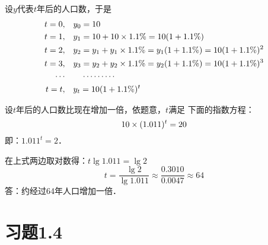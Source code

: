 \begin{solution}
设$y$代表$t$年后的人口数，于是
\[\begin{split}
    t=0,&\quad y_0=10\\
t=1,&\quad y_1=10+10\times1.1\%=10(1+1.1\%)\\
t=2,&\quad y_2=y_1+y_1\times1.1\%=y_1(1+1.1\%)=10(1+1.1\%)^2\\
t=3,&\quad y_3=y_2+y_2\times1.1\%=y_2(1+1.1\%)=10(1+1.1\%)^3\\
\cdots & \qquad \cdots\cdots\cdots\\
t=t,&\quad y_t=10(1+1.1\%)^t
\end{split}\]

设$t$年后的人口数比现在增加一倍，依题意，$t$满足
下面的指数方程：
\[10\times(1.011)^t=20\]
即：$1.011^t=2$．

在上式两边取对数得：$t\lg 1.011=\lg 2$
\[t=\frac{\lg2}{\lg1.011}\approx\frac{0.3010}{0.0047}\approx 64\]
答：约经过64年人口增加一倍．
\end{solution}

\section*{习题1.4}

